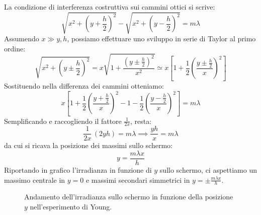\documentclass[openany,a4paper,12pt]{book}
\begin{document}
La condizione di interferenza costruttiva sui cammini ottici si scrive:
\begin{equation}
    \sqrt{x^2 + \left(y + \frac{h}{2}\right)^2} - \sqrt{x^2 + \left(y - \frac{h}{2}\right)^2} = m\lambda
\end{equation}
Assumendo $x \gg y, h$, possiamo effettuare uno sviluppo in serie di Taylor al primo ordine:
\begin{equation}
    \sqrt{x^2 + \left(y \pm \frac{h}{2}\right)^2} = x \sqrt{1 + \frac{\left(y \pm \frac{h}{2}\right)^2}{x^2}} \simeq x \left[1 + \frac{1}{2}\left(\frac{y \pm \frac{h}{2}}{x}\right)^2\right]
\end{equation}
Sostituendo nella differenza dei cammini otteniamo:
\begin{equation}
    x \left[1 + \frac{1}{2}\left(\frac{y + \frac{h}{2}}{x}\right)^2 - 1 - \frac{1}{2}\left(\frac{y - \frac{h}{2}}{x}\right)^2\right] = m\lambda
\end{equation}
Semplificando e raccogliendo il fattore $\frac{1}{2x}$, resta:
\begin{equation}
    \frac{1}{2x} \, (2yh) = m\lambda \implies \frac{yh}{x} = m\lambda
\end{equation}
da cui si ricava la posizione dei massimi sullo schermo:
\[
    y = \frac{m\lambda x}{h}
\]
Riportando in grafico l'irradianza in funzione di $y$ sullo schermo, ci aspettiamo un massimo centrale in $y = 0$ e massimi secondari simmetrici in $y = \pm \frac{m\lambda x}{h}$.

\begin{figure}[H]
    \centering
    \caption{Andamento dell'irradianza sullo schermo in funzione della posizione $y$ nell'esperimento di Young.}
\end{figure}
\end{document}
